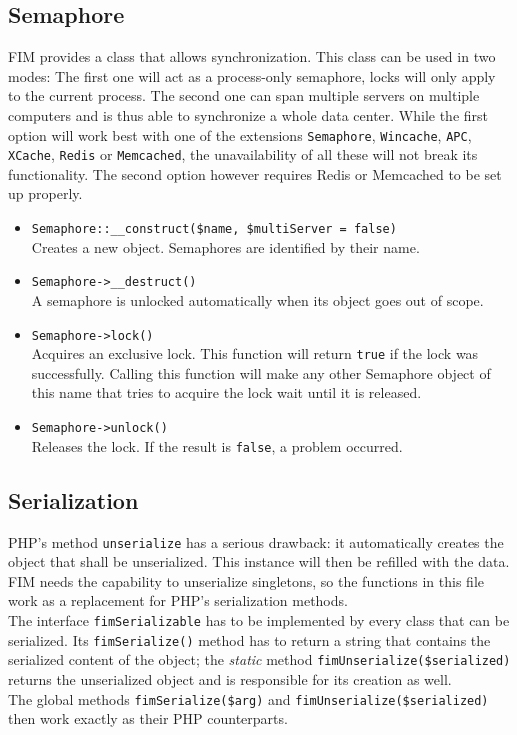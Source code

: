 \documentclass{scrartcl}
\begin{document}
   \subsection{Semaphore}
      FIM provides a class that allows synchronization. This class can be used in two modes: The first one will act as a process-only semaphore, locks will only apply to the current process. The second one can span multiple servers on multiple computers and is thus able to synchronize a whole data center. While the first option will work best with one of the extensions \texttt{Semaphore}, \texttt{Wincache}, \texttt{APC}, \texttt{XCache}, \texttt{Redis} or \texttt{Memcached}, the unavailability of all these will not break its functionality. The second option however requires Redis or Memcached to be set up properly.
      \begin{itemize}
         \item \lstinline!Semaphore::__construct($name, $multiServer = false)! \\
            Creates a new object. Semaphores are identified by their name.
         \item \lstinline!Semaphore->__destruct()! \\
            A semaphore is unlocked automatically when its object goes out of scope.
         \item \lstinline!Semaphore->lock()! \\
            Acquires an exclusive lock. This function will return \lstinline!true! if the lock was successfully. Calling this function will make any other Semaphore object of this name that tries to acquire the lock wait until it is released.
         \item \lstinline!Semaphore->unlock()! \\
            Releases the lock. If the result is \lstinline!false!, a problem occurred.
      \end{itemize}
   \subsection{Serialization}
      PHP's method \lstinline!unserialize! has a serious drawback: it automatically creates the object that shall be unserialized. This instance will then be refilled with the data. FIM needs the capability to unserialize singletons, so the functions in this file work as a replacement for PHP's serialization methods. \\
      The interface \lstinline!fimSerializable! has to be implemented by every class that can be serialized. Its \lstinline!fimSerialize()! method has to return a string that contains the serialized content of the object; the \emph{static} method \lstinline!fimUnserialize($serialized)! returns the unserialized object and is responsible for its creation as well. \\
      The global methods \lstinline!fimSerialize($arg)! and \lstinline!fimUnserialize($serialized)! then work exactly as their PHP counterparts.
\end{document}
